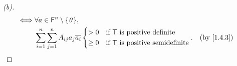 \begin{proof}[(b)]
\begin{align*}
    \iff & \forall a \in \vs{F}^n \setminus \set{\zv},                                                                                                     \\
         & \sum_{i = 1}^n \sum_{j = 1}^n A_{i j} a_j \conj{a_i} \begin{dcases}
                                                                  > 0    & \text{if } \T \text{ is positive definite}     \\
                                                                  \geq 0 & \text{if } \T \text{ is positive semidefinite}
                                                                \end{dcases}.                                          &  & \by{1.4.3}
  \end{align*}
\end{proof}

